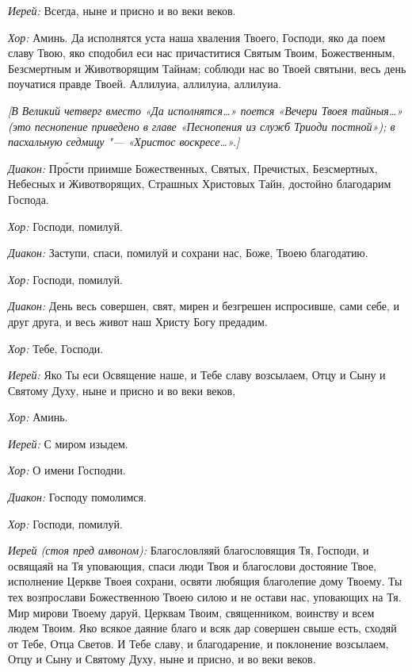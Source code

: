 \begin{mymulticols}
{\itshape Иерей:} Всегда, ныне и присно и во веки веков.

{\itshape Хор:} Аминь. Да исполнятся уста наша хваления Твоего, Господи, яко да поем славу Твою, яко сподобил еси нас причаститися Святым Твоим, Божественным, Безсмертным и Животворящим Тайнам; соблюди нас во Твоей святыни, весь день поучатися правде Твоей. Аллилуиа, аллилуиа, аллилуиа. 

{\itshape [В Великий четверг вместо «Да исполнятся…» поется «Вечери Твоея тайныя…» (это песнопение приведено в главе «Песнопения из служб Триоди постной»); в пасхальную седмицу "--- «Христос воскресе…».]}


{\itshape Диакон:} Пр\'{о}сти приимше Божественных, Святых, Пречистых, Безсмертных, Небесных и Животворящих, Страшных Христовых Тайн, достойно благодарим Господа. 

{\itshape Хор:} Господи, помилуй. 

{\itshape Диакон:} Заступи, спаси, помилуй и сохрани нас, Боже, Твоею благодатию. 

{\itshape Хор:} Господи, помилуй. 

{\itshape Диакон:} День весь совершен, свят, мирен и безгрешен испросивше, сами себе, и друг друга, и весь живот наш Христу Богу предадим. 

{\itshape Хор:} Тебе, Господи. 

{\itshape Иерей:} Яко Ты еси Освящение наше, и Тебе славу возсылаем, Отцу и Сыну и Святому Духу, ныне и присно и во веки веков,

{\itshape Хор:} Аминь.

{\itshape Иерей:} С миром изыдем.

{\itshape Хор:} О имени Господни. 

{\itshape Диакон:} Господу помолимся.

{\itshape Хор:} Господи, помилуй. 


{\itshape  Иерей (стоя пред амвоном):} Благословляяй благословящия Тя, Господи, и освящаяй на Тя уповающия, спаси люди Твоя и благослови достояние Твое, исполнение Церкве Твоея сохрани, освяти любящия благолепие дому Твоему. Ты тех возпрослави Божественною Твоею силою и не остави нас, уповающих на Тя. Мир мирови Твоему даруй, Церквам Твоим, священником, воинству и всем людем Твоим. Яко всякое даяние благо и всяк дар совершен свыше есть, сходяй от Тебе, Отца Светов. И Тебе славу, и благодарение, и поклонение возсылаем, Отцу и Сыну и Святому Духу, ныне и присно, и во веки веков. 


\end{mymulticols}
